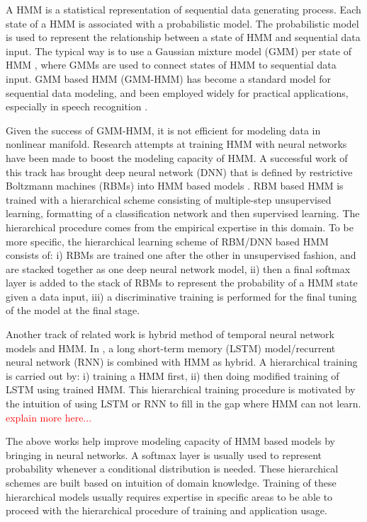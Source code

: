 \documentclass{ecai}
\begin{document}
A HMM is a statistical representation of sequential data generating process.
Each state of a HMM is associated with a probabilistic model.
The probabilistic model is used to represent the relationship between a state of HMM and sequential data input. The typical way is to use a Gaussian mixture model (GMM) per state of HMM \cite{juang1986maximum}, where GMMs are used to connect states of HMM to sequential data input. GMM based HMM (GMM-HMM) has become a standard model for sequential data modeling, and been employed widely for practical applications, especially in speech recognition \cite{gales2008application,chatterjee2011auditory}.

Given the success of GMM-HMM, it is not efficient for modeling data in nonlinear manifold. Research attempts at training HMM with neural networks have been made to boost the modeling capacity of HMM. A successful work of this track has brought deep neural network (DNN) that is defined by restrictive Boltzmann machines (RBMs) \cite{Hinton2012} into HMM based models \cite{hinton2012deepSpeech,li2013hybrid,Miao2013ImprovingLC}. RBM based HMM is trained with a hierarchical scheme consisting of multiple-step unsupervised learning, formatting of a classification network and then supervised learning. The hierarchical procedure comes from the empirical expertise in this domain. To be more specific, the hierarchical learning scheme of RBM/DNN based HMM consists of: i) RBMs are trained one after the other in unsupervised fashion, and are stacked together as one deep neural network model, ii) then a final softmax layer is added to the stack of RBMs to represent the probability of a HMM state given a data input, iii) a discriminative training is performed for the final tuning of the model at the final stage.

Another track of related work is hybrid method of temporal neural network models and HMM. In \cite{liu2019lstmHmmHyb,buys2018bridging,vik2016rnnHmm}, a long short-term memory (LSTM) model/recurrent neural network (RNN) is combined with HMM as hybrid. A hierarchical training is carried out by: i) training a HMM first, ii) then doing modified training of LSTM using trained HMM. This hierarchical training procedure is motivated by the intuition of using LSTM or RNN to fill in the gap where HMM can not learn. \textcolor{red}{explain more here...}


The above works help improve modeling capacity of HMM based models by bringing in neural networks. A softmax layer is usually used to represent probability whenever a conditional distribution is needed. These hierarchical schemes are built based on intuition of domain knowledge. Training of these hierarchical models usually requires expertise in specific areas to be able to proceed with the hierarchical procedure of training and application usage. 
\end{document}
